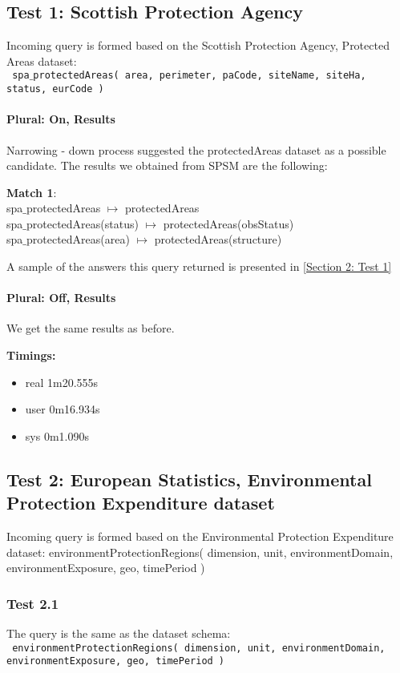 \documentclass[a4paper,10pt]{article}
\begin{document}
\subsection{Test 1: Scottish Protection Agency}

Incoming query is formed based on the  Scottish Protection Agency, Protected Areas dataset:\\
\indent \texttt{ spa$\_$protectedAreas( area, perimeter, paCode, siteName, siteHa, status, eurCode )}
	

\paragraph{Plural: On, Results} Narrowing - down process suggested the protectedAreas dataset as a possible candidate. 
The results we obtained from SPSM are the following:

\textbf{Match 1}: \\
spa$\_$protectedAreas $\mapsto$ protectedAreas \\
spa$\_$protectedAreas(status) $\mapsto$ protectedAreas(obsStatus)\\
spa$\_$protectedAreas(area) $\mapsto$ protectedAreas(structure)

A sample of the answers this query returned is presented in \ref{Section 2: Test 1}
\paragraph{Plural: Off, Results} We get the same results as before.

\textbf{Timings:}
\begin{itemize}
\item real	1m20.555s
\item user	0m16.934s
\item sys	0m1.090s

\end{itemize}


\subsection{Test 2: European Statistics, Environmental Protection Expenditure dataset}

Incoming query is formed based on the  Environmental Protection Expenditure dataset:
\indent  environmentProtectionRegions( dimension, unit, environmentDomain,  environmentExposure, geo, timePeriod )
	

\subsubsection{Test 2.1 }
The query is  the same as the dataset schema:\\
\indent \texttt{ environmentProtectionRegions( dimension, unit, environmentDomain,  environmentExposure, geo, timePeriod )}
	
\end{document}

